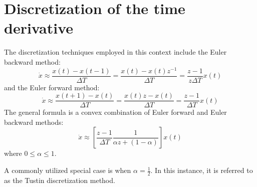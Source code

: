 \section{Discretization of the time derivative}

The discretization techniques employed in this context include the Euler backward method:
\[\dot{x}\approx \dfrac{x(t)-x(t-1)}{\Delta T}=\dfrac{x(t)-x(t)z^{-1}}{\Delta T}=\dfrac{z-1}{z\Delta T}x(t)\]
and the Euler forward method:
\[\dot{x}\approx \dfrac{x(t+1)-x(t)}{\Delta T}=\dfrac{x(t)z-x(t)}{\Delta T}=\dfrac{z-1}{\Delta T}x(t)\]
The general formula is a convex combination of Euler forward and Euler backward methods:
\[\dot{x}\approx \left[\dfrac{z-1}{\Delta T}\dfrac{1}{\alpha z + (1-\alpha)}\right]x(t) \]
where  $0 \leq\alpha\leq 1$. 

A commonly utilized special case is when $\alpha=\frac{1}{2}$. 
In this instance, it is referred to as the Tustin discretization method.